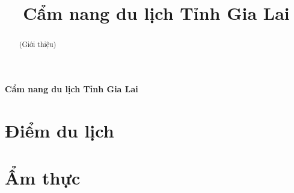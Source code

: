\documentclass{article}
\title{Cẩm nang du lịch Tỉnh Gia Lai}
\begin{document}
\begin{center}
    \fontsize{18}{20}\textbf{Cẩm nang du lịch Tỉnh Gia Lai}
\end{center}
\begin{abstract}
    (Giới thiệu)
\end{abstract}
\section*{Điểm du lịch}
\newpage
\section*{{Ẩm thực}}
\end{document}
